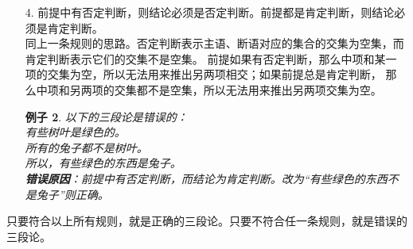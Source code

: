 \documentclass[12pt,UTF8]{ctexbook}
\newtheorem*{ex*}{例子}
\begin{document}
\begin{enumerate}
    \begin{ex*}
        以下的三段论是错误的： \\
        \indent 有些树叶不是白色的。\\
        \indent 所有的兔子都不是树叶。\\
        \indent 所以，所有的兔子都不是白色的。\\
        \textbf{错误原因}：两个前提都是否定判断。所以我们无法确定“兔子”和“白色”的关系。
    \end{ex*} 
    \item[4.] 前提中有否定判断，则结论必须是否定判断。前提都是肯定判断，则结论必须是肯定判断。\\
    同上一条规则的思路。否定判断表示主语、断语对应的集合的交集为空集，而肯定判断表示它们的交集不是空集。
    前提如果有否定判断，那么中项和某一项的交集为空，所以无法用来推出另两项相交；如果前提总是肯定判断，
    那么中项和另两项的交集都不是空集，所以无法用来推出另两项交集为空。
    \begin{ex*}
        以下的三段论是错误的： \\
        \indent 有些树叶是绿色的。\\
        \indent 所有的兔子都不是树叶。\\
        \indent 所以，有些绿色的东西是兔子。\\
        \textbf{错误原因}：前提中有否定判断，而结论为肯定判断。改为“有些绿色的东西不是兔子”则正确。
    \end{ex*}
\end{enumerate}
只要符合以上所有规则，就是正确的三段论。只要不符合任一条规则，就是错误的三段论。
\end{document}
